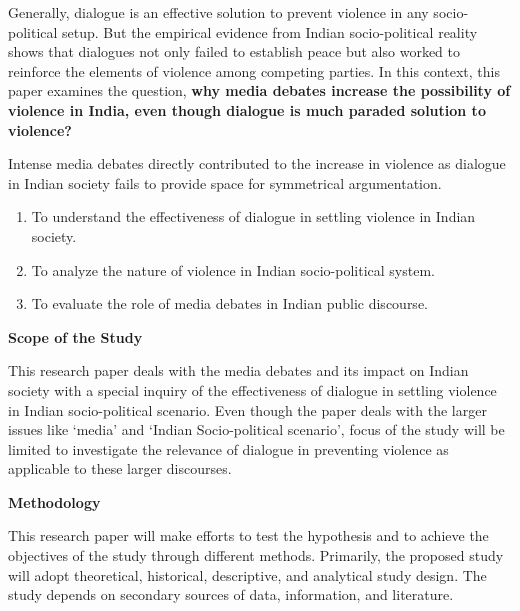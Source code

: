 \begin{multicols}{2}

\noi
Generally, dialogue is an effective solution to prevent violence in any socio-political setup. But
the empirical evidence from Indian socio-political reality shows that dialogues not only failed to
establish peace but also worked to reinforce the elements of violence among competing parties.
In this context, this paper examines the question, \textbf{why media debates increase the possibility of
violence in India, even though dialogue is much paraded solution to violence?}


\noi
Intense media debates directly contributed to the increase in violence as dialogue in Indian society
fails to provide space for symmetrical argumentation.


\vspace{-.2cm}

\begin{enumerate}[label=$\bullet$]
\itemsep=0pt

\item To understand the effectiveness of dialogue in settling violence in Indian society.

\item To analyze the nature of violence in Indian socio-political system.

\item To evaluate the role of media debates in Indian public discourse.
\end{enumerate}

\vspace{-.2cm}

\noi
{\normalsize\bfseries Scope of the Study}

\noi
This research paper deals with the media debates and its impact on Indian society with a special
inquiry of the effectiveness of dialogue in settling violence in Indian socio-political scenario.
Even though the paper deals with the larger issues like ‘media’ and ‘Indian Socio-political
scenario’, focus of the study will be limited to investigate the relevance of dialogue in preventing
violence as applicable to these larger discourses.

\noi
{\normalsize\bfseries Methodology}

\noi
This research paper will make efforts to test the hypothesis and to achieve the objectives of the
study through different methods. Primarily, the proposed study will adopt theoretical, historical,
descriptive, and analytical study design. The study depends on secondary sources of data,
information, and literature.


\end{multicols}
